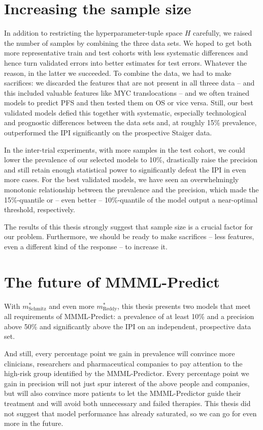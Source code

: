\section{Increasing the sample size}

In addition to restricting the hyperparameter-tuple space $H$ carefully, we raised the number of 
samples by combining the three data sets. We hoped to get both more representative train and test 
cohorts with less systematic differences and hence turn validated errors into better estimates 
for test errors. Whatever the reason, in the latter we succeeded. To combine the data, we had to 
make sacrifices: we discarded the features that are 
not present in all threee data -- and this included valuable features like MYC translocations -- 
and we often trained models to predict PFS and then tested them on OS or vice versa. Still, our 
best validated models defied this together with systematic, especially technological and prognostic 
differences between the data sets and, at roughly \num{15}\% prevalence, outperformed the IPI 
significantly on the prospective Staiger data.

In the inter-trial experiments, with more samples in the test cohort, we could lower the prevalence 
of our selected models to \num{10}\%, drastically raise the precision and still retain enough 
statistical power to significantly defeat the IPI in even more cases. For the best validated models, 
we have seen an overwhelmingly monotonic relationship between the prevalence and the precision, 
which made the \num{15}\%-quantile or -- even better -- \num{10}\%-quantile of the model output a 
near-optimal threshold, respectively. 

The results of this thesis strongly suggest that sample size is a crucial factor 
for our problem. Furthermore, we should be ready to make sacrifices -- less features, 
even a different kind of the response -- to increase it. 

\section{The future of MMML-Predict}

With $m^*_\text{Schmitz}$ and even more $m^*_\text{Reddy}$, this thesis presents two 
models that meet all requirements of MMML-Predict: a prevalence of at least \num{10}\% and a 
precision above \num{50}\% and significantly above the IPI on an independent, prospective data set. 

And still, every percentage point we gain in prevalence will convince more clinicians, researchers 
and pharmaceutical companies to pay attention to the high-risk group identified by the MMML-Predictor.
Every percentage point we gain in precision will not just spur interest of the above people and 
companies, but will also convince more patients to let the MMML-Predictor guide their treatment and 
will avoid both unnecessary and failed therapies. This thesis did not suggest that model performance 
has already saturated, so we can go for even more in the future.

